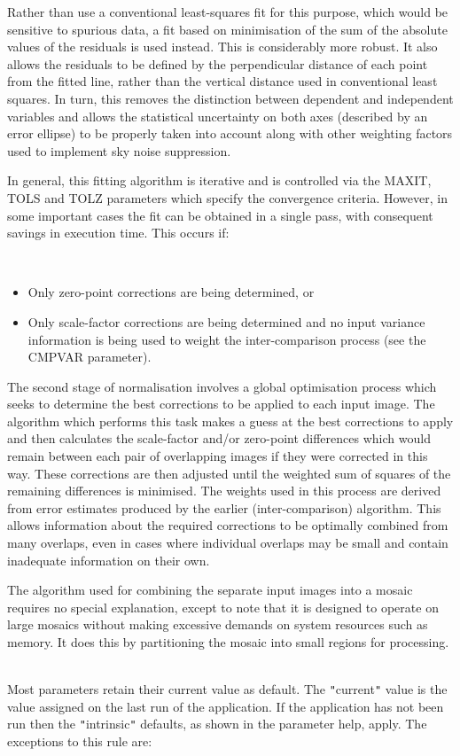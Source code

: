\documentclass[twoside,11pt]{article}
\renewcommand{\_}{\texttt{\symbol{95}}}
\newcommand{\qt}[1]{{\tt "}#1{\tt "}}
\newcommand{\sstdiytopic}[2]{\item[#1:] \mbox{} \\[1.3ex] #2}
\newcommand{\sstitemlist}[1]{
  \mbox{} \\
  \vspace{-3.5ex}
  \begin{itemize}
     #1
  \end{itemize}
}
\newcommand{\sstitem}{\item}
\newcommand{\sstdiytopic}[2]{\item[{#1}] #2 }
\newcommand{\sstitemlist}[1]{
      \begin{itemize}
         #1
      \end{itemize}
      \\
   }
\newcommand{\sstitem}{\item}
\begin{document}
{{      Rather than use a conventional least-squares fit for this
      purpose, which would be sensitive to spurious data, a fit based
      on minimisation of the sum of the absolute values of the
      residuals is used instead. This is considerably more robust. It
      also allows the residuals to be defined by the perpendicular
      distance of each point from the fitted line, rather than the
      vertical distance used in conventional least squares. In turn,
      this removes the distinction between dependent and independent
      variables and allows the statistical uncertainty on both axes
      (described by an error ellipse) to be properly taken into account
      along with other weighting factors used to implement sky noise
      suppression.

      In general, this fitting algorithm is iterative and is controlled
      via the MAXIT, TOLS and TOLZ parameters which specify the
      convergence criteria. However, in some important cases the fit
      can be obtained in a single pass, with consequent savings in
      execution time. This occurs if:
      \sstitemlist{

         \sstitem
            Only zero-point corrections are being determined, or

         \sstitem
            Only scale-factor corrections are being determined and no
               input variance information is being used to weight the
               inter-comparison process (see the CMPVAR parameter).

      }
      The second stage of normalisation involves a global optimisation
      process which seeks to determine the best corrections to be
      applied to each input image. The algorithm which performs this task
      makes a guess at the best corrections to apply and then
      calculates the scale-factor and/or zero-point differences which
      would remain between each pair of overlapping images if they were
      corrected in this way. These corrections are then adjusted until
      the weighted sum of squares of the remaining differences is
      minimised. The weights used in this process are derived from
      error estimates produced by the earlier (inter-comparison)
      algorithm. This allows information about the required corrections
      to be optimally combined from many overlaps, even in cases where
      individual overlaps may be small and contain inadequate
      information on their own.

      The algorithm used for combining the separate input images into a
      mosaic requires no special explanation, except to note that it is
      designed to operate on large mosaics without making excessive
      demands on system resources such as memory. It does this by
      partitioning the mosaic into small regions for processing.
   }
   \sstdiytopic{
      Behaviour of parameters
   } {
      Most parameters retain their current value as default. The
      \qt{current} value is the value assigned on the last run of the
      application. If the application has not been run then the
      \qt{intrinsic} defaults, as shown in the parameter help, apply.
      The exceptions to this rule are:
      \sstitemlist{

}}}
\end{document}
